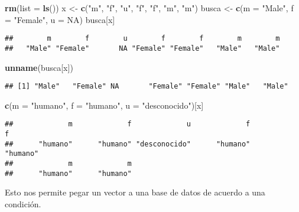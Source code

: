 \documentclass[]{article}
\newenvironment{Shaded}{\begin{snugshade}}{\end{snugshade}}
\newcommand{\KeywordTok}[1]{\textcolor[rgb]{0.13,0.29,0.53}{\textbf{{#1}}}}
\newcommand{\DataTypeTok}[1]{\textcolor[rgb]{0.13,0.29,0.53}{{#1}}}
\newcommand{\StringTok}[1]{\textcolor[rgb]{0.31,0.60,0.02}{{#1}}}
\newcommand{\OtherTok}[1]{\textcolor[rgb]{0.56,0.35,0.01}{{#1}}}
\newcommand{\NormalTok}[1]{{#1}}
\begin{document}
\begin{Shaded}
\begin{Highlighting}[]
\KeywordTok{rm}\NormalTok{(}\DataTypeTok{list =} \KeywordTok{ls}\NormalTok{())}
\NormalTok{x <-}\StringTok{ }\KeywordTok{c}\NormalTok{(}\StringTok{"m"}\NormalTok{, }\StringTok{"f"}\NormalTok{, }\StringTok{"u"}\NormalTok{, }\StringTok{"f"}\NormalTok{, }\StringTok{"f"}\NormalTok{, }\StringTok{"m"}\NormalTok{, }\StringTok{"m"}\NormalTok{)}
\NormalTok{busca <-}\StringTok{ }\KeywordTok{c}\NormalTok{(}\DataTypeTok{m =} \StringTok{"Male"}\NormalTok{, }\DataTypeTok{f =} \StringTok{"Female"}\NormalTok{, }\DataTypeTok{u =} \OtherTok{NA}\NormalTok{)}
\NormalTok{busca[x]}
\end{Highlighting}
\end{Shaded}

\begin{verbatim}
##        m        f        u        f        f        m        m 
##   "Male" "Female"       NA "Female" "Female"   "Male"   "Male"
\end{verbatim}

\begin{Shaded}
\begin{Highlighting}[]
\KeywordTok{unname}\NormalTok{(busca[x])}
\end{Highlighting}
\end{Shaded}

\begin{verbatim}
## [1] "Male"   "Female" NA       "Female" "Female" "Male"   "Male"
\end{verbatim}

\begin{Shaded}
\begin{Highlighting}[]
\KeywordTok{c}\NormalTok{(}\DataTypeTok{m =} \StringTok{"humano"}\NormalTok{, }\DataTypeTok{f =} \StringTok{"humano"}\NormalTok{, }\DataTypeTok{u =} \StringTok{"desconocido"}\NormalTok{)[x]}
\end{Highlighting}
\end{Shaded}

\begin{verbatim}
##             m             f             u             f             f 
##      "humano"      "humano" "desconocido"      "humano"      "humano" 
##             m             m 
##      "humano"      "humano"
\end{verbatim}

Esto nos permite pegar un vector a una base de datos de acuerdo a una
condición.
\end{document}
